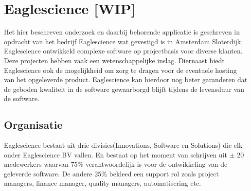 \chapter{Eaglescience [WIP]} %

\label{ch:Eaglescience} %


Het hier beschreven onderzoek en daarbij behorende applicatie is geschreven in opdracht van het bedrijf Eaglescience wat gevestigd is in Amsterdam Sloterdijk. Eaglescience ontwikkeld complexe software op projectbasis voor diverse klanten. Deze projecten hebben vaak een wetenschappelijke inslag. Diernaast biedt Eaglescience ook de mogelijkheid om zorg te dragen voor de eventuele hosting van het opgeleverde product. Eaglescience kan hierdoor nog beter garanderen dat de geboden kwaliteit in de software gewaarborgd blijft tijdens de levensduur van de software.

\section{Organisatie}

Eaglescience bestaat uit drie divisies(Innovations, Software en Solutions) die elk onder Eaglescience BV vallen. En bestaat op het moment van schrijven uit $\pm$ 20 medewerkers waarvan 75\% verantwoordelijk is voor de ontwikkeling van de geleverde software. De andere 25\% bekleed een support rol zoals project managers, finance manager, quality managers, automatisering etc. \\

